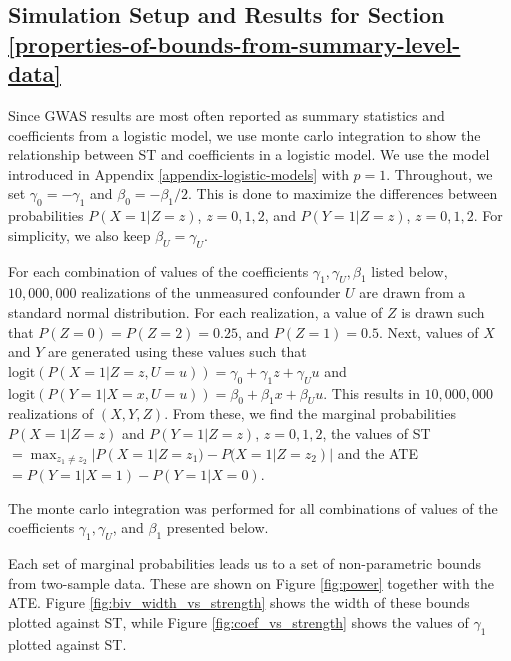 \documentclass[
]{article}
\theoremstyle{plain}
\begin{document}
\newpage

\hypertarget{simulation-setup-and-results-for-section}{%
\subsection{\texorpdfstring{Simulation Setup and Results for Section \ref{properties-of-bounds-from-summary-level-data} \label{appendix-sim-results}}{Simulation Setup and Results for Section  }}\label{simulation-setup-and-results-for-section}}

Since GWAS results are most often reported as summary statistics and coefficients from a logistic model, we use monte carlo integration to show the relationship between ST and coefficients in a logistic model. We use the model introduced in Appendix \ref{appendix-logistic-models} with \(p=1\). Throughout, we set \(\gamma_0 = -\gamma_1\) and \(\beta_0 = -\beta_1/2\). This is done to maximize the differences between probabilities \(P(X = 1 | Z = z)\), \(z=0,1,2\), and \(P(Y = 1 | Z = z)\), \(z=0,1,2\). For simplicity, we also keep \(\beta_U = \gamma_U\).

For each combination of values of the coefficients \(\gamma_1, \gamma_U, \beta_1\) listed below, \(10,000,000\) realizations of the unmeasured confounder \(U\) are drawn from a standard normal distribution. For each realization, a value of \(Z\) is drawn such that \(P(Z = 0) = P(Z = 2) = 0.25\), and \(P(Z = 1) = 0.5\). Next, values of \(X\) and \(Y\) are generated using these values such that \(\text{logit}(P(X = 1 | Z = z, U = u)) = \gamma_0 + \gamma_1 z + \gamma_U u\) and \(\text{logit}(P(Y = 1 | X = x, U = u)) = \beta_0 + \beta_1 x + \beta_U u\). This results in \(10,000,000\) realizations of \((X,Y,Z)\). From these, we find the marginal probabilities \(P(X = 1 | Z = z)\) and \(P(Y = 1 | Z = z)\), \(z = 0,1,2\), the values of ST \(=\max_{z_1 \neq z_2} |P(X = 1 | Z = z_1) - P(X = 1 | Z = z_2)|\) and the ATE \(= P(Y = 1 | X = 1) - P(Y = 1 | X = 0)\).

\begin{table}[H]
  \centering
  \caption{The monte carlo integration was performed for all combinations of values of the coefficients $\gamma_1, \gamma_U$, and $\beta_1$ presented below.}
  \label{tab:sim_coefficients}
  
\end{table}

Each set of marginal probabilities leads us to a set of non-parametric bounds from two-sample data. These are shown on Figure \ref{fig:power} together with the ATE. Figure \ref{fig:biv_width_vs_strength} shows the width of these bounds plotted against ST, while Figure \ref{fig:coef_vs_strength} shows the values of \(\gamma_1\) plotted against ST.
\end{document}
